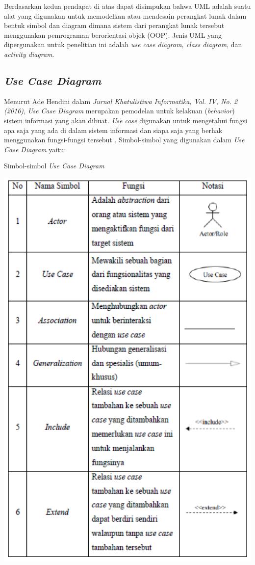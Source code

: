 Berdasarkan kedua pendapat di atas dapat disimpukan bahwa UML adalah suatu alat yang digunakan untuk memodelkan atau mendesain perangkat lunak dalam bentuk simbol dan diagram dimana sistem dari perangkat lunak tersebut menggunakan pemrograman berorientasi objek (OOP). Jenis UML yang dipergunakan untuk penelitian ini adalah \textit{use case diagram, class diagram}, dan \textit{activity diagram}. 

\subsection{\emph{Use Case Diagram}} 

Menurut Ade Hendini dalam \textit{Jurnal Khatulistiwa Informatika, Vol. IV, No. 2 (2016)}, \textit{Use Case Diagram }merupakan pemodelan untuk kelakuan (\textit{behavior}) sistem informasi yang akan dibuat. \textit{Use case} digunakan untuk mengetahui fungsi apa saja yang ada di dalam sistem informasi dan siapa saja yang berhak menggunakan fungsi-fungsi tersebut \cite{AdeHendini}. Simbol-simbol yang digunakan dalam \textit{Use Case Diagram} yaitu:

\begin{table}[H]
	\centering
	\caption{Simbol-simbol \emph{Use Case Diagram}}
	\includegraphics[width=1.0\textwidth]{gambar/simbolusecase}
	\label{tabel_karaktermax2}
\end{table}

